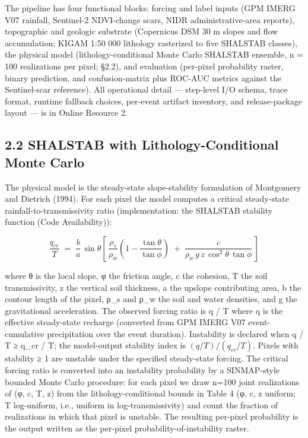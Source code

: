 \documentclass[11pt,a4paper]{article}
\begin{document}
The pipeline has four functional blocks: forcing and label inputs (GPM IMERG V07 rainfall, Sentinel-2 NDVI-change scars, NIDR administrative-area reports), topographic and geologic substrate (Copernicus DSM 30 m slopes and flow accumulation; KIGAM 1:50 000 lithology rasterized to five SHALSTAB classes), the physical model (lithology-conditional Monte Carlo SHALSTAB ensemble, n = 100 realizations per pixel; §2.2), and evaluation (per-pixel probability raster, binary prediction, and confusion-matrix plus ROC-AUC metrics against the Sentinel-scar reference). All operational detail --- step-level I/O schema, trace format, runtime fallback choices, per-event artifact inventory, and release-package layout --- is in Online Resource 2.

\subsection{2.2 SHALSTAB with Lithology-Conditional Monte Carlo}\label{shalstab-with-lithology-conditional-monte-carlo}

The physical model is the steady-state slope-stability formulation of Montgomery and Dietrich (1994). For each pixel the model computes a critical steady-state rainfall-to-transmissivity ratio (implementation: the SHALSTAB stability function (Code Availability)):

\[
\frac{q_{cr}}{T} \;=\; \frac{b}{a}\,\sin\theta \left[\, \frac{\rho_s}{\rho_w}\!\left(1 - \frac{\tan\theta}{\tan\phi}\right) \;+\; \frac{c}{\rho_w\, g\, z\, \cos^2\theta\, \tan\phi} \,\right]
\]

where θ is the local slope, φ the friction angle, c the cohesion, T the soil transmissivity, z the vertical soil thickness, a the upslope contributing area, b the contour length of the pixel, ρ\_s and ρ\_w the soil and water densities, and g the gravitational acceleration. The observed forcing ratio is q / T where q is the effective steady-state recharge (converted from GPM IMERG V07 event-cumulative precipitation over the event duration). Instability is declared when q / T ≥ q\_cr / T; the model-output stability index is \((q/T)/(q_{cr}/T)\). Pixels with stability ≥ 1 are unstable under the specified steady-state forcing. The critical forcing ratio is converted into an instability probability by a SINMAP-style bounded Monte Carlo procedure: for each pixel we draw n=100 joint realizations of (φ, c, T, z) from the lithology-conditional bounds in Table 4 (φ, c, z uniform; T log-uniform, i.e., uniform in log-transmissivity) and count the fraction of realizations in which that pixel is unstable. The resulting per-pixel probability is the output written as the per-pixel probability-of-instability raster.
\end{document}
